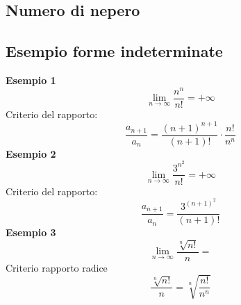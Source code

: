 \subsection{Numero di nepero}
\subsection{Esempio forme indeterminate}
\textbf{Esempio 1}
\[
	\lim_{n \to \infty} \frac{n^{n}}{n!} = + \infty
\]
Criterio del rapporto:
\[
	\frac{a_{n+1}}{a_n} = \frac{\left( n+1 \right) ^{n+1}}{\left( n+1 \right) !} \cdot\frac{n!}{n^{n}}
\]
\textbf{Esempio 2}
\[
	\lim_{n \to \infty} \frac{3^{n^{2}}}{n!} = +\infty
\]
Criterio del rapporto:
\[
	\frac{a_{n+1}}{a_n} = \frac{3^{\left( n+1 \right) ^{2}}}{\left( n+1 \right) !}
\]
\textbf{Esempio 3}
\[
	\lim_{n \to \infty} \frac{\sqrt[n]{n!} }{n} =
\]
Criterio rapporto radice
\[
	\frac{\sqrt[n]{n!} }{n} = \sqrt[n]{\frac{n!}{n^{n}}}
\]
